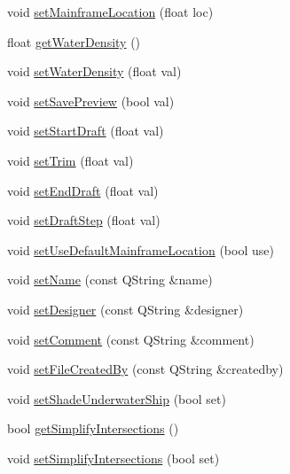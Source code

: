\begin{DoxyCompactItemize}
void \hyperlink{classShipCAD_1_1ProjectSettings_acac72dbc1dc2f68c1d32981ac9a27603}{set\-Mainframe\-Location} (float loc)
\item 
float \hyperlink{classShipCAD_1_1ProjectSettings_a8a0cffbd479739406500541a7d896d4a}{get\-Water\-Density} ()
\item 
void \hyperlink{classShipCAD_1_1ProjectSettings_af4de74cc452581cf8f7e02431ba3e45a}{set\-Water\-Density} (float val)
\item 
void \hyperlink{classShipCAD_1_1ProjectSettings_a3590a9b52236a4aeb9991ea03c518871}{set\-Save\-Preview} (bool val)
\item 
void \hyperlink{classShipCAD_1_1ProjectSettings_a9e389573e2266b099f49452d68edf24f}{set\-Start\-Draft} (float val)
\item 
void \hyperlink{classShipCAD_1_1ProjectSettings_afdab155f3ca324b3c200a97c9ade1ff6}{set\-Trim} (float val)
\item 
void \hyperlink{classShipCAD_1_1ProjectSettings_a45e70a08ac47cdf30971a7386af702a9}{set\-End\-Draft} (float val)
\item 
void \hyperlink{classShipCAD_1_1ProjectSettings_a45081194c5e105780429b0f214bab186}{set\-Draft\-Step} (float val)
\item 
void \hyperlink{classShipCAD_1_1ProjectSettings_a7c0f0e54fb2fb94a70b823fca6a6a58d}{set\-Use\-Default\-Mainframe\-Location} (bool use)
\item 
void \hyperlink{classShipCAD_1_1ProjectSettings_acaa6149ff4c93c829a72a3a3d2ff5239}{set\-Name} (const Q\-String \&name)
\item 
void \hyperlink{classShipCAD_1_1ProjectSettings_abde123a71eba642ff1dbd62d547aa684}{set\-Designer} (const Q\-String \&designer)
\item 
void \hyperlink{classShipCAD_1_1ProjectSettings_a64e942847dd0838f04dc4ec32e9bc30e}{set\-Comment} (const Q\-String \&comment)
\item 
void \hyperlink{classShipCAD_1_1ProjectSettings_a326e18ff53ba0f916d4d8cfab5a2d17f}{set\-File\-Created\-By} (const Q\-String \&createdby)
\item 
void \hyperlink{classShipCAD_1_1ProjectSettings_a0f40362f42e6dfd4147d69573c00988f}{set\-Shade\-Underwater\-Ship} (bool set)
\item 
bool \hyperlink{classShipCAD_1_1ProjectSettings_a2e5f2bfb546885af0af8d857198b8cc9}{get\-Simplify\-Intersections} ()
\item 
void \hyperlink{classShipCAD_1_1ProjectSettings_a138264f53da99f6a1765ea7aec95096a}{set\-Simplify\-Intersections} (bool set)

\end{DoxyCompactItemize}
